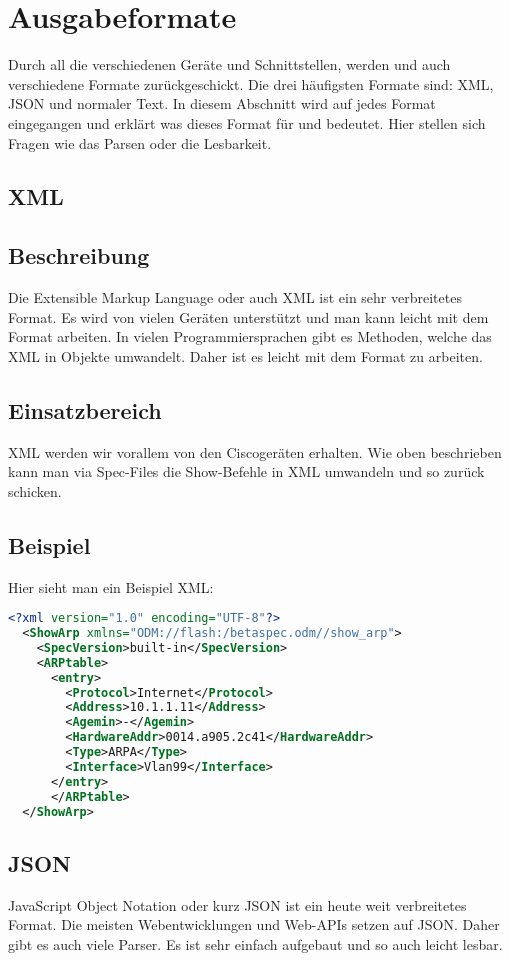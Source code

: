 \documentclass[a4,12pt]{scrartcl}
\begin{document}
\section{Ausgabeformate}
Durch all die verschiedenen Geräte und Schnittstellen, werden und auch verschiedene Formate zurückgeschickt. Die drei häufigsten Formate sind: XML, JSON und normaler Text. In diesem Abschnitt wird auf jedes Format eingegangen und erklärt was dieses Format für und bedeutet. Hier stellen sich Fragen wie das Parsen oder die Lesbarkeit.
\subsection{XML}
\subsection{Beschreibung}
Die Extensible Markup Language oder auch XML ist ein sehr verbreitetes Format. Es wird von vielen Geräten unterstützt und man kann leicht mit dem Format arbeiten.
In vielen Programmiersprachen gibt es Methoden, welche das XML in Objekte umwandelt. Daher ist es leicht mit dem Format zu arbeiten.
\subsection{Einsatzbereich}
XML werden wir vorallem von den Ciscogeräten erhalten. Wie oben beschrieben kann man via Spec-Files die Show-Befehle in XML umwandeln und so zurück schicken.
\subsection{Beispiel}
Hier sieht man ein Beispiel XML:\newline
\begin{lstlisting}[language=xml]
<?xml version="1.0" encoding="UTF-8"?>
  <ShowArp xmlns="ODM://flash:/betaspec.odm//show_arp">
    <SpecVersion>built-in</SpecVersion>
    <ARPtable>
      <entry>
        <Protocol>Internet</Protocol>
        <Address>10.1.1.11</Address>
        <Agemin>-</Agemin>
        <HardwareAddr>0014.a905.2c41</HardwareAddr>
        <Type>ARPA</Type>
        <Interface>Vlan99</Interface>
      </entry>
      </ARPtable>
  </ShowArp>
\end{lstlisting}
\subsection{JSON}
JavaScript Object Notation oder kurz JSON ist ein heute weit verbreitetes Format. Die meisten Webentwicklungen und Web-APIs setzen auf JSON. Daher gibt es auch viele Parser. Es ist sehr einfach aufgebaut und so auch leicht lesbar.
\end{document}
